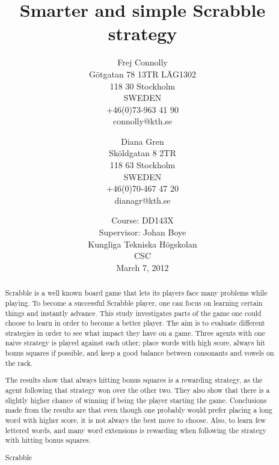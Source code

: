 \documentclass[a4paper, 12pt]{report}
\begin{document}
\graphicspath{{./images/}}
\title{Smarter and simple Scrabble strategy}
\date{Course: DD143X \\ Supervisor: Johan Boye \\ Kungliga Tekniska Högskolan \\ CSC \\ March 7, 2012}
\author{Frej Connolly \\ Götgatan 78 13TR LÄG1302 \\ 118 30 Stockholm \\ SWEDEN \\ +46(0)73-963 41 90 \\ connolly@kth.se \\
        \and Diana Gren \\ Sköldgatan 8 2TR \\ 118 63 Stockholm \\ SWEDEN \\ +46(0)70-467 47 20 \\ dianagr@kth.se}

\maketitle
\begin{abstract}
Scrabble is a well known board game that lets its players face many problems while playing. To become a successful Scrabble player, one can focus on learning certain things and instantly advance. This study investigates parts of the game one could choose to learn in order to become a better player. The aim is to evaluate different strategies in order to see what impact they have on a game. Three agents with one naive strategy is played against each other; place words with high score, always hit bonus squares if possible, and keep a good balance between consonants and vowels on the rack. 

The results show that always hitting bonus squares is a rewarding strategy, as the agent following that strategy won over the other two. They also show that there is a slightly higher chance of winning if being the player starting the game. Conclusions made from the results are that even though one probably would prefer placing a long word with higher score, it is not always the best move to choose. Also, to learn few lettered words, and many word extensions is rewarding when following the strategy with hitting bonus squares.
\end{abstract}

\begin{abstract}
Scrabble 
\end{abstract}
\tableofcontents
\end{document}
